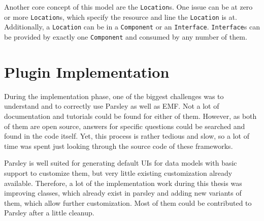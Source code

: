 Another core concept of this model are the \lstinline|Location|s.
One issue can be at zero or more \lstinline|Location|s, which specify the resource and line the \lstinline|Location| is at.
Additionally, a \lstinline|Location| can be in a \lstinline|Component| or an \lstinline|Interface|.
\lstinline|Interface|s can be provided by exactly one \lstinline|Component| and consumed by any number of them.

\section{Plugin Implementation}
\label{sec:ch4:s4}
During the implementation phase, one of the biggest challenges was to understand and to correctly use \gls{Parsley} as well as \gls{EMF}.
Not a lot of documentation and tutorials could be found for either of them.
However, as both of them are open source, answers for specific questions could be searched and found in the code itself.
Yet, this process is rather tedious and slow, so a lot of time was spent just looking through the source code of these frameworks.

\Gls{Parsley} is well suited for generating default \glspl{UI} for data models with basic support to customize them, 
but very little existing customization already available.
Therefore, a lot of the implementation work during this thesis was improving classes, which already exist in parsley 
and adding new variants of them, which allow further customization.
Most of them could be contributed to \gls{Parsley} after a little cleanup.

